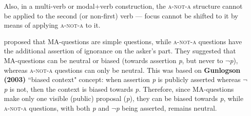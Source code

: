 \documentclass[12pt, UTF8]{article}
\begin{document}

Also, in a multi-verb or modal+verb construction, the \textsc{a-not-a} structure cannot be applied to the second (or non-first) verb --- focus cannot be shifted to it by means of applying \textsc{a-not-a} to it.

\begin{exe}

\end{exe}





\cite{Yuan-Hara2013} proposed that MA-questions are simple questions, while \textsc{a-not-a} questions have the additional assertion of ignorance on the asker's part. They suggested that MA-questions can be neutral or biased (towards assertion \textit{p}, but never to $\neg$\textit{p}), whereas \textsc{a-not-a} questions can only be neutral. This was based on \textbf{Gunlogson (2003)} ``biased context" concept: when assertion \textit{p} is publicly asserted whereas $\neg$\textit{p} is not, then the context is biased towards \textit{p}. Therefore, since MA-questions make only one visible (public) proposal (\textit{p}), they can be biased towards \textit{p}, while \textsc{a-not-a} questions, with both \textit{p} and $\neg$\textit{p} being asserted, remains neutral. 
\end{document}

